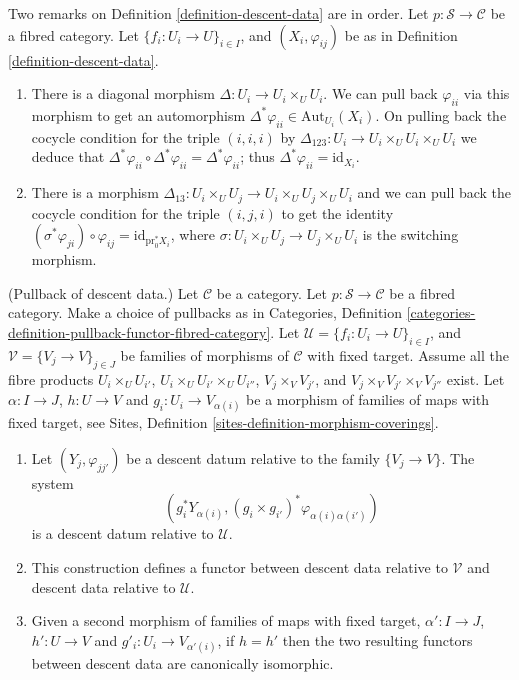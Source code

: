 \begin{remarks}
\label{remarks-definition-descent-datum}
Two remarks on Definition \ref{definition-descent-data} are in order.
Let $p : \mathcal{S} \to \mathcal{C}$ be a fibred category.
Let $\{f_i : U_i \to U\}_{i \in I}$, and $(X_i, \varphi_{ij})$
be as in Definition \ref{definition-descent-data}.
\begin{enumerate}
\item There is a diagonal morphism $\Delta : U_i \to U_i \times_U U_i$.
We can pull back $\varphi_{ii}$ via this morphism to get an automorphism
$\Delta^\ast \varphi_{ii} \in \text{Aut}_{U_i}(X_i)$.
On pulling back the cocycle condition for the triple $(i, i, i)$
by $\Delta_{123} : U_i \to U_i \times_U U_i \times_U U_i$ we deduce that
$\Delta^\ast \varphi_{ii} \circ \Delta^\ast \varphi_{ii} =
\Delta^\ast \varphi_{ii}$; thus $\Delta^\ast \varphi_{ii} =
\text{id}_{X_i}$.
\item There is a morphism
$\Delta_{13}: U_i \times_U U_j \to U_i \times_U U_j \times_U U_i$
and we can pull back the
cocycle condition for the triple $(i, j, i)$ to get the
identity $(\sigma^\ast \varphi_{ji}) \circ \varphi_{ij} =
\text{id}_{\text{pr}_0^\ast X_i}$, where
$\sigma : U_i \times_U U_j \to U_j \times_U U_i$ is the switching morphism.
\end{enumerate}
\end{remarks}

\begin{lemma}
\label{lemma-pullback}
(Pullback of descent data.)
Let $\mathcal{C}$ be a category.
Let $p : \mathcal{S} \to \mathcal{C}$ be a fibred category.
Make a choice of pullbacks as in Categories,
Definition \ref{categories-definition-pullback-functor-fibred-category}.
Let $\mathcal{U} = \{f_i : U_i \to U\}_{i \in I}$, and
$\mathcal{V} = \{V_j \to V\}_{j \in J}$
be families of morphisms of $\mathcal{C}$ with fixed target.
Assume all the fibre products
$U_i \times_U U_{i'}$, $U_i \times_U U_{i'} \times_U U_{i''}$,
$V_j \times_V V_{j'}$, and $V_j \times_V V_{j'} \times_V V_{j''}$ exist.
Let $\alpha : I \to J$, $h : U \to V$ and
$g_i : U_i \to V_{\alpha(i)}$ be a morphism of families
of maps with fixed target, see
Sites, Definition \ref{sites-definition-morphism-coverings}.
\begin{enumerate}
\item Let $(Y_j, \varphi_{jj'})$ be a descent datum relative to the
family $\{V_j \to V\}$. The system
$$
\left(
g_i^*Y_{\alpha(i)},
(g_i \times g_{i'})^*\varphi_{\alpha(i)\alpha(i')}
\right)
$$
is a descent datum relative to $\mathcal{U}$.
\item This construction defines a functor between descent data relative
to $\mathcal{V}$ and descent data relative to $\mathcal{U}$.
\item Given a second morphism of families of maps with fixed target,
$\alpha' : I \to J$, $h' : U \to V$ and
$g'_i : U_i \to V_{\alpha'(i)}$, if $h = h'$ then the two resulting functors
between descent data are canonically isomorphic.
\end{enumerate}
\end{lemma}

